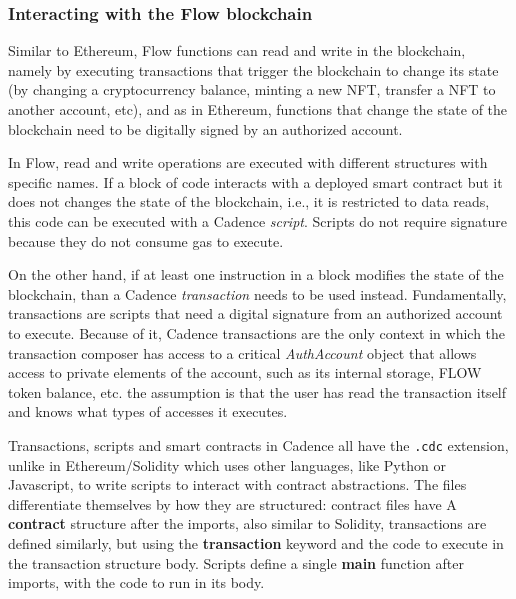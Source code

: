 \documentclass[../main.tex]{subfiles}
\begin{document}
\subsubsection{Interacting with the Flow blockchain}
Similar to Ethereum, Flow functions can read and write in the blockchain, namely by executing transactions that trigger the blockchain to change its state (by changing a cryptocurrency balance, minting a new NFT, transfer a NFT to another account, etc), and as in Ethereum, functions that change the state of the blockchain need to be digitally signed by an authorized account.
\par
In Flow, read and write operations are executed with different structures with specific names. If a block of code interacts with a deployed smart contract but it does not changes the state of the blockchain, i.e., it is restricted to data reads, this code can be executed with a Cadence \textit{script}. Scripts do not require signature because they do not consume gas to execute.
\par
On the other hand, if at least one instruction in a block modifies the state of the blockchain, than a Cadence \textit{transaction} needs to be used instead. Fundamentally, transactions are scripts that need a digital signature from an authorized account to execute. Because of it, Cadence transactions are the only context in which the transaction composer has access to a critical \textit{AuthAccount} object that allows access to private elements of the account, such as its internal storage, FLOW token balance, etc. the assumption is that the user has read the transaction itself and knows what types of accesses it executes.
\par
Transactions, scripts and smart contracts in Cadence all have the \verb|.cdc| extension, unlike in Ethereum/Solidity which uses other languages, like Python or Javascript, to write scripts to interact with contract abstractions. The files differentiate themselves by how they are structured: contract files have A \textbf{contract} structure after the imports, also similar to Solidity, transactions are defined similarly, but using the \textbf{transaction} keyword and the code to execute in the transaction structure body. Scripts define a single \textbf{main} function after imports, with the code to run in its body.
\end{document}

